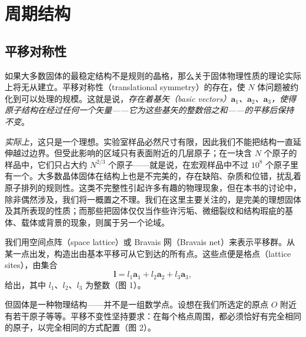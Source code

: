 

\chapter{周期结构}


\section{平移对称性}

如果大多数固体的最稳定结构不是规则的晶格，那么关于固体物理性质的理论实际上将无从建立。平移对称性（translational symmetry）的存在，使 $N$ 体问题被约化到可以处理的规模。这就是说，\emph{存在着基矢（basic vectors）$\mathbf{a}_1$、$\mathbf{a}_2$、$\mathbf{a}_3$，使得原子结构在经过任何一个矢量——它为这些基矢的整数倍之和——的平移后保持不变}。

\emph{实际上}，这只是一个理想。实验室样品必然尺寸有限，因此我们不能把结构一直延伸越过边界。但受此影响的区域只有表面附近的几层原子；在一块含 $N$ 个原子的样品中，它们只占大约 $N^{2/3}$ 个原子——就是说，在宏观样品中不过 $10^{8}$ 个原子里有一个。大多数晶体固体在结构上也是不完美的，存在缺陷、杂质和位错，扰乱着原子排列的规则性。这类不完整性引起许多有趣的物理现象，但在本书的讨论中，除非偶然涉及，我们将一概置之不理。我们在这里主要关注的，是完美的理想固体及其所表现的性质；而那些把固体仅仅当作些许污垢、微细裂纹和结构瑕疵的基体、载体或背景的现象，则属于另一个论域。

我们用空间点阵（space lattice）或 Bravais 网（Bravais net）来表示平移群。从某一点出发，构造出由基本平移可从它到达的所有点。这些点便是格点（lattice sites），由集合
\begin{equation*}
\boldsymbol{l} = l_1\mathbf{a}_1 + l_2\mathbf{a}_2 + l_3\mathbf{a}_3,
\tag{1.1}
\end{equation*}
给出，其中 $l_1$、$l_2$、$l_3$ 为整数（图 1）。

但固体是一种物理结构——并不是一组数学点。设想在我们所选定的原点 $O$ 附近有若干原子等等。平移不变性坚持要求：在每个格点周围，都必须恰好有完全相同的原子，以完全相同的方式配置（图 2）。


